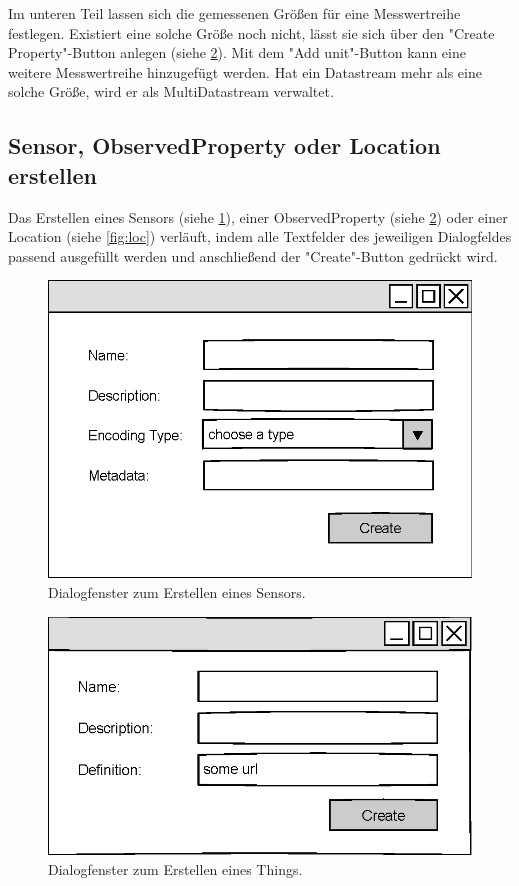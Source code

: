 \documentclass[a4paper, 12 pt]{article}
\begin{document}
Im unteren Teil lassen sich die gemessenen Größen für eine Messwertreihe festlegen. Existiert eine solche Größe noch nicht, lässt sie sich über den "{Create Property}"{-Button} anlegen (siehe \cref{fig:oprop}). Mit dem "{Add unit}"{-Button} kann eine weitere Messwertreihe hinzugefügt werden. Hat ein Datastream mehr als eine solche Größe, wird er als MultiDatastream verwaltet.



\subsection{Sensor, ObservedProperty oder Location erstellen}
Das Erstellen eines Sensors (siehe \cref{fig:sensor}), einer ObservedProperty (siehe \cref{fig:oprop}) oder einer Location (siehe \cref{fig:loc}) verläuft, indem alle Textfelder des jeweiligen Dialogfeldes passend ausgefüllt werden und anschließend der "{Create}"{-Button} gedrückt wird.

\begin{figure}[htbp]
\centering
\includegraphics[scale=1]{images/sensor}
\caption{\label{fig:sensor}Dialogfenster zum Erstellen eines Sensors.}
\end{figure}

\begin{figure}[htbp]
\centering
\includegraphics[scale=1]{images/oprop}
\caption{\label{fig:oprop}Dialogfenster zum Erstellen eines Things.}
\end{figure}
\end{document}
